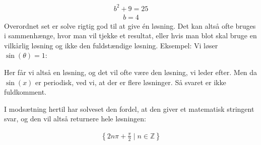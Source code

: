 \documentclass[letterpaper,10pt,english]{jupyterBook}
\begin{document}
\begin{sphinxVerbatim}[commandchars=\\\{\}]
  \PYG{p}{[}   \PYG{p}{]} 
\end{sphinxVerbatim}
\begin{equation*}
\begin{split}\displaystyle b^{2} + 9 = 25\end{split}
\end{equation*}\begin{equation*}
\begin{split}\displaystyle b = 4\end{split}
\end{equation*}
Overordnet set er solve rigtig god til at give én løsning. Det kan altså ofte bruges i sammenhænge, hvor man vil tjekke et resultat, eller hvis man blot skal bruge en vilkårlig løsning og ikke den fuldstændige løsning.
Eksempel: Vi løser \(\sin(\theta) = 1\):

\begin{sphinxVerbatim}[commandchars=\\\{\}]
  
\end{sphinxVerbatim}

\begin{sphinxVerbatim}[commandchars=\\\{\}]
[pi/2]
\end{sphinxVerbatim}

Her får vi altså en løsning, og det vil ofte være den løsning, vi leder efter. Men da \(\sin(x)\) er periodisk, ved vi, at der er flere løsninger. Så svaret er ikke fuldkomment.

I modsætning hertil har solveset den fordel, at den giver et  matematisk stringent svar, og den vil altså returnere hele løsningen:

\begin{sphinxVerbatim}[commandchars=\\\{\}]
  
\end{sphinxVerbatim}
\begin{equation*}
\begin{split}\displaystyle \left\{2 n \pi + \frac{\pi}{2}\; |\; n \in \mathbb{Z}\right\}\end{split}
\end{equation*}
\end{document}
